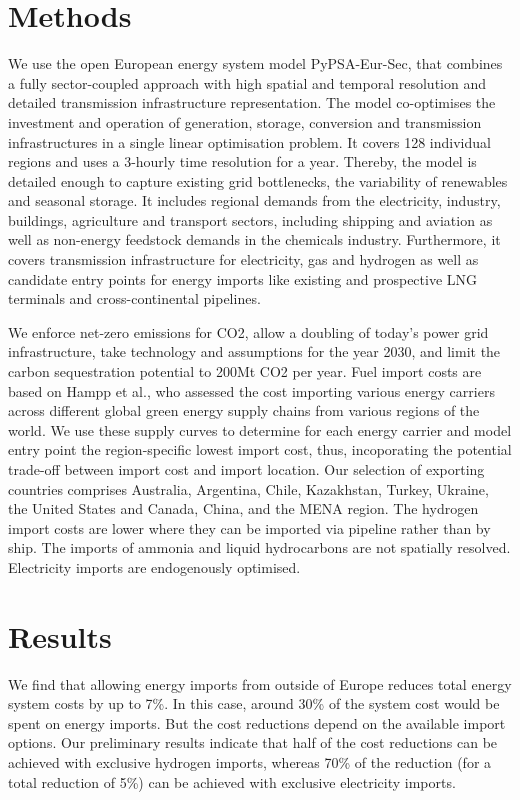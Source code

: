\documentclass[10pt,5p,reversenotenum,lefttitle]{elsarticle}
\begin{document}
\section*{Methods}

We use the open European energy system model PyPSA-Eur-Sec, that combines a
fully sector-coupled approach with high spatial and temporal resolution and
detailed transmission infrastructure representation. The model co-optimises the
investment and operation of generation, storage, conversion and transmission
infrastructures in a single linear optimisation problem. It covers 128
individual regions and uses a 3-hourly time resolution for a year. Thereby, the
model is detailed enough to capture existing grid bottlenecks, the
variability of renewables and seasonal storage. It
includes regional demands from the electricity, industry, buildings, agriculture
and transport sectors, including shipping and aviation as well as non-energy
feedstock demands in the chemicals industry. Furthermore, it covers
transmission infrastructure for electricity, gas and hydrogen as well as
candidate entry points for energy imports like existing and prospective LNG
terminals and cross-continental pipelines.

We enforce net-zero emissions for CO2, allow a
doubling of today's power grid infrastructure, take technology and assumptions
for the year 2030, and limit the carbon sequestration potential to 200Mt CO2
per year. Fuel import costs are based on Hampp et al., who assessed the cost importing various energy carriers across
different global green energy supply chains from various regions of the world.
We use these supply curves to determine for each energy carrier and model entry
point the region-specific lowest import cost, thus, incoporating the potential
trade-off between import cost and import location.
Our selection of exporting countries comprises Australia, Argentina, Chile,
Kazakhstan, Turkey, Ukraine, the United States and Canada, China, and the MENA region. The hydrogen import costs are lower where they can be imported via pipeline
rather than by ship. The imports of ammonia and liquid hydrocarbons are not
spatially resolved. Electricity imports are endogenously optimised.

\section*{Results}

We find that allowing energy imports from outside of Europe reduces total energy
system costs by up to 7\%. In this case, around 30\% of the system cost would be
spent on energy imports. But the cost reductions depend on the available import
options. Our preliminary results indicate that half of the cost reductions can
be achieved with exclusive hydrogen imports, whereas 70\% of the reduction (for
a total reduction of 5\%) can be achieved with exclusive electricity imports.
\end{document}
